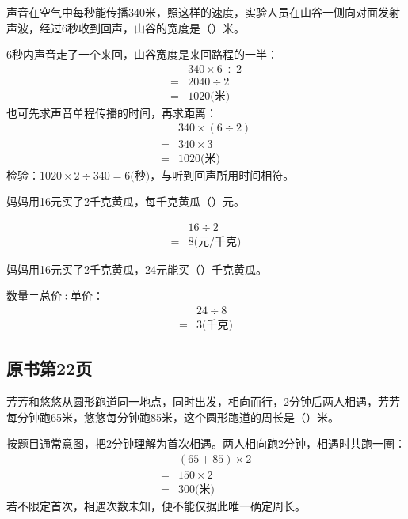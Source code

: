 声音在空气中每秒能传播340米，照这样的速度，实验人员在山谷一侧向对面发射声波，经过6秒收到回声，山谷的宽度是（\hspace{1.8em}）米。\par
\begin{BookAnswer}
6秒内声音走了一个来回，山谷宽度是来回路程的一半：\[\begin{aligned} &340\times6\div2\\={}&2040\div2\\={}&1020\text{(米)}\end{aligned}\]也可先求声音单程传播的时间，再求距离：\[\begin{aligned} &340\times(6\div2)\\={}&340\times3\\={}&1020\text{(米)}\end{aligned}\]检验：\(1020\times2\div340=6\text{(秒)}\)，与听到回声所用时间相符。
\end{BookAnswer}

妈妈用16元买了2千克黄瓜，每千克黄瓜（\hspace{1.8em}）元。\par
\begin{BookAnswer}
\[\begin{aligned} &16\div2\\={}&8\text{(元/千克)}\end{aligned}\]
\end{BookAnswer}

妈妈用16元买了2千克黄瓜，24元能买（\hspace{1.8em}）千克黄瓜。\par
\begin{BookAnswer}
数量＝总价÷单价：\[\begin{aligned} &24\div8\\={}&3\text{(千克)}\end{aligned}\]
\end{BookAnswer}



\subsection*{原书第22页}

芳芳和悠悠从圆形跑道同一地点，同时出发，相向而行，2分钟后两人相遇，芳芳每分钟跑65米，悠悠每分钟跑85米，这个圆形跑道的周长是（\hspace{1.8em}）米。\par
\begin{BookAnswer}
按题目通常意图，把2分钟理解为首次相遇。两人相向跑2分钟，相遇时共跑一圈：\[\begin{aligned} &(65+85)\times2\\={}&150\times2\\={}&300\text{(米)}\end{aligned}\]若不限定首次，相遇次数未知，便不能仅据此唯一确定周长。
\end{BookAnswer}


